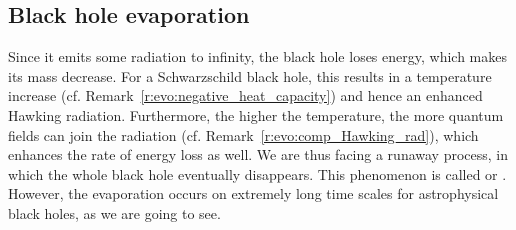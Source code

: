 \subsection{Black hole evaporation}

Since it emits some radiation to infinity, the black hole loses energy, which
makes its mass decrease. For a Schwarzschild black hole,
this results in a temperature increase (cf. Remark~\ref{r:evo:negative_heat_capacity})
and hence an enhanced Hawking radiation. Furthermore, the higher the temperature,
the more quantum fields can join the radiation
(cf. Remark~\ref{r:evo:comp_Hawking_rad}), which enhances
the rate of energy loss as well. We are thus facing a runaway process, in which the whole
black hole eventually disappears. This phenomenon is called
 or
.
However, the evaporation occurs on extremely long time scales for astrophysical black holes,
as we are going to see.

